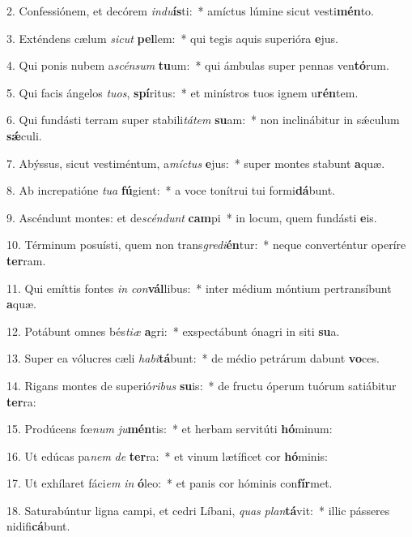 2. Confessiónem, et decórem \textit{ind}\textit{u}\textbf{ís}ti:~*  amíctus lúmine sicut vesti\textbf{mén}to.\

3. Exténdens cælum \textit{sic}\textit{ut} \textbf{pel}lem:~*  qui tegis aquis superióra \textbf{e}jus.\

4. Qui ponis nubem a\textit{scén}\textit{sum} \textbf{tu}um:~*  qui ámbulas super pennas ven\textbf{tó}rum.\

5. Qui facis ángelos \textit{tu}\textit{os}, \textbf{spí}ritus:~*  et minístros tuos ignem u\textbf{rén}tem.\

6. Qui fundásti terram super stabili\textit{tá}\textit{tem} \textbf{su}am:~*  non inclinábitur in sǽculum \textbf{sǽ}culi.\

7. Abýssus, sicut vestiméntum, a\textit{míc}\textit{tus} \textbf{e}jus:~*  super montes stabunt \textbf{a}quæ.\

8. Ab increpatióne \textit{tu}\textit{a} \textbf{fú}gient:~*  a voce tonítrui tui formi\textbf{dá}bunt.\

9. Ascéndunt montes: et de\textit{scén}\textit{dunt} \textbf{cam}pi~*  in locum, quem fundásti \textbf{e}is.\

10. Términum posuísti, quem non trans\textit{gre}\textit{di}\textbf{én}tur:~*  neque converténtur operíre \textbf{ter}ram.\

11. Qui emíttis fontes \textit{in} \textit{con}\textbf{vál}libus:~*  inter médium móntium pertransíbunt \textbf{a}quæ.\

12. Potábunt omnes bés\textit{ti}\textit{æ} \textbf{a}gri:~*  exspectábunt ónagri in siti \textbf{su}a.\

13. Super ea vólucres cæli \textit{ha}\textit{bi}\textbf{tá}bunt:~*  de médio petrárum dabunt \textbf{vo}ces.\

14. Rigans montes de superió\textit{ri}\textit{bus} \textbf{su}is:~*  de fructu óperum tuórum satiábitur \textbf{ter}ra:\

15. Prodúcens fœ\textit{num} \textit{ju}\textbf{mén}tis:~*  et herbam servitúti \textbf{hó}minum:\

16. Ut edúcas pa\textit{nem} \textit{de} \textbf{ter}ra:~*  et vinum lætíficet cor \textbf{hó}minis:\

17. Ut exhílaret fáci\textit{em} \textit{in} \textbf{ó}leo:~*  et panis cor hóminis con\textbf{fír}met.\

18. Saturabúntur ligna campi, et cedri Líbani, \textit{quas} \textit{plan}\textbf{tá}vit:~*  illic pásseres nidifi\textbf{cá}bunt.\

